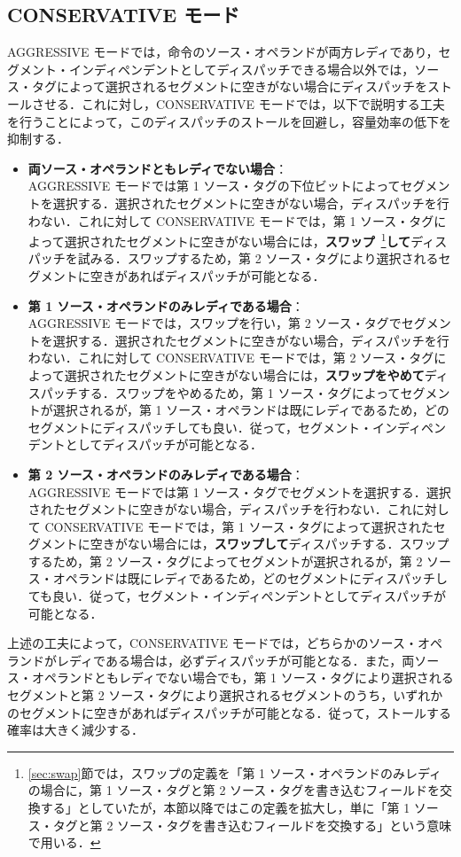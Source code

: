 \subsection{CONSERVATIVE モード}
AGGRESSIVE モードでは，命令のソース・オペランドが両方レディであり，セグメント・インディペンデントとしてディスパッチできる場合以外では，ソース・タグによって選択されるセグメントに空きがない場合にディスパッチをストールさせる．これに対し，CONSERVATIVE モードでは，以下で説明する工夫を行うことによって，このディスパッチのストールを回避し，容量効率の低下を抑制する．
\begin{itemize}
  \item \textbf{両ソース・オペランドともレディでない場合}：\\AGGRESSIVE モードでは第 1 ソース・タグの下位ビットによってセグメントを選択する．選択されたセグメントに空きがない場合，ディスパッチを行わない．これに対して CONSERVATIVE モードでは，第 1 ソース・タグによって選択されたセグメントに空きがない場合には，\textbf{スワップ}~\footnote{\ref{sec:swap}節では，スワップの定義を「第 1 ソース・オペランドのみレディの場合に，第 1 ソース・タグと第 2 ソース・タグを書き込むフィールドを交換する」としていたが，本節以降ではこの定義を拡大し，単に「第 1 ソース・タグと第 2 ソース・タグを書き込むフィールドを交換する」という意味で用いる．}\textbf{して}ディスパッチを試みる．スワップするため，第 2 ソース・タグにより選択されるセグメントに空きがあればディスパッチが可能となる．
  \item \textbf{第 1 ソース・オペランドのみレディである場合}：\\AGGRESSIVE モードでは，スワップを行い，第 2 ソース・タグでセグメントを選択する．選択されたセグメントに空きがない場合，ディスパッチを行わない．これに対して CONSERVATIVE モードでは，第 2 ソース・タグによって選択されたセグメントに空きがない場合には，\textbf{スワップをやめて}ディスパッチする．スワップをやめるため，第 1 ソース・タグによってセグメントが選択されるが，第 1 ソース・オペランドは既にレディであるため，どのセグメントにディスパッチしても良い．従って，セグメント・インディペンデントとしてディスパッチが可能となる．
  \item \textbf{第 2 ソース・オペランドのみレディである場合}：\\AGGRESSIVE モードでは第 1 ソース・タグでセグメントを選択する．選択されたセグメントに空きがない場合，ディスパッチを行わない．これに対して CONSERVATIVE モードでは，第 1 ソース・タグによって選択されたセグメントに空きがない場合には，\textbf{スワップして}ディスパッチする．スワップするため，第 2 ソース・タグによってセグメントが選択されるが，第 2 ソース・オペランドは既にレディであるため，どのセグメントにディスパッチしても良い．従って，セグメント・インディペンデントとしてディスパッチが可能となる．
\end{itemize}
上述の工夫によって，CONSERVATIVE モードでは，どちらかのソース・オペランドがレディである場合は，必ずディスパッチが可能となる．また，両ソース・オペランドともレディでない場合でも，第 1 ソース・タグにより選択されるセグメントと第 2 ソース・タグにより選択されるセグメントのうち，いずれかのセグメントに空きがあればディスパッチが可能となる．従って，ストールする確率は大きく減少する．

